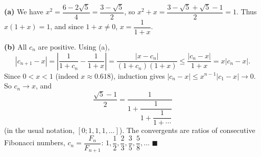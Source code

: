 \textbf{(a)} We have $x^2=\dfrac{6-2\sqrt5}{4}=\dfrac{3-\sqrt5}{2}$, so $x^2+x=\dfrac{3-\sqrt5+\sqrt5-1}{2}=1$. Thus $x(1+x)=1$, and since $1+x\ne0$, $x=\dfrac{1}{1+x}$.

\textbf{(b)} All $c_n$ are positive. Using (a),
\[
\left|c_{n+1}-x\right|=\left|\dfrac{1}{1+c_n}-\dfrac{1}{1+x}\right|=\dfrac{\left|x-c_n\right|}{(1+c_n)(1+x)}\le\dfrac{\left|c_n-x\right|}{1+x}=x\left|c_n-x\right| .
\]
Since $0<x<1$ (indeed $x\approx0.618$), induction gives $\left|c_n-x\right|\le x^{n-1}\left|c_1-x\right|\to0$. So $c_n\to x$, and
\[
\dfrac{\sqrt5-1}{2}=\boxed{\dfrac{1}{1+\dfrac{1}{1+\dfrac{1}{1+\cdots}}}}
\]
(in the usual notation, $[0;1,1,1,\dots]$). The convergents are ratios of consecutive Fibonacci numbers, $c_n=\dfrac{F_n}{F_{n+1}}$: $1,\dfrac{1}{2},\dfrac{2}{3},\dfrac{3}{5},\dfrac{5}{8},\dots$ $\blacksquare$
